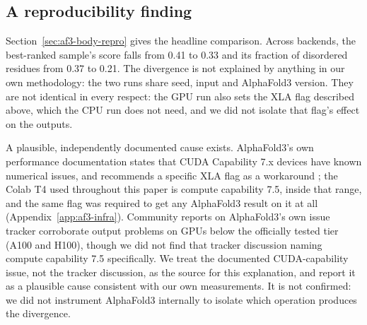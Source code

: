 \subsection{A reproducibility finding}
\label{app:af3-repro}

Section~\ref{sec:af3-body-repro} gives the headline comparison. Across
backends, the best-ranked sample's score falls from 0.41 to 0.33 and its
fraction of disordered residues from 0.37 to 0.21.
The divergence is not explained by anything in our own methodology: the
two runs share seed, input and AlphaFold3 version. They are not identical in every respect: the GPU
run also sets the XLA flag described above, which the CPU run does not
need, and we did not isolate that flag's effect on the outputs.

A plausible, independently documented cause exists. AlphaFold3's own
performance documentation states that CUDA Capability 7.x devices have
known numerical issues, and recommends a specific XLA flag as a
workaround \citep{af3docs2026}; the Colab T4 used throughout this paper
is compute capability 7.5, inside that range, and the same flag was
required to get any AlphaFold3 result on it at all
(Appendix~\ref{app:af3-infra}). Community reports on AlphaFold3's own
issue tracker corroborate output problems on GPUs below the officially
tested tier (A100 and H100), though we did not find that tracker
discussion naming compute capability 7.5 specifically. We treat the
documented CUDA-capability issue, not the tracker discussion, as the
source for this explanation, and report it as a plausible cause
consistent with our own measurements. It is not confirmed: we did not
instrument AlphaFold3 internally to isolate which operation
produces the divergence.

